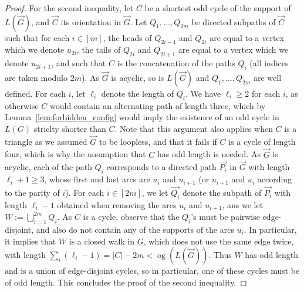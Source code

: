 \documentclass[11pt,a4aper]{article}
\renewcommand{\ge}{\geqslant}
\renewcommand{\geq}{\geqslant}
\DeclareRobustCommand*{\ora}{\overrightarrow}
\DeclareMathOperator{\og}{og}
\newcommand*{\orC}{\ora{C}}
\newcommand*{\orG}{\ora{G}}
\newcommand{\ugo}[1]{{\color{red} UG: #1}}
\begin{document}
\begin{proof}
  For the second inequality, let $C$ be a shortest odd cycle of the support of $L(\orG)$, and $\orC$ its orientation in $\orG$. Let
  $Q_1, \dots, Q_{2m}$ be directed subpaths of $\orC$ such that for each $i\in [m]$, the heads of
  $Q_{2i-1}$ and $Q_{2i}$ are equal to a vertex which we denote $u_{2i}$, the tails of $Q_{2i}$
  and $Q_{2i+1}$ are equal to a vertex which we denote $u_{2i+1}$, and such that $C$
  is the concatenation of the paths $Q_i$ (all indices are taken modulo $2m$). As $\orG$ is acyclic, so is $L(\orG)$
  and $Q_1, \dots, Q_{2m}$ are well defined.
  For each $i$, let $\ell_i$ denote the
  length of $Q_i$. We have $\ell_i \ge 2$ for each $i$, as otherwise $C$
  would contain an alternating path of length three, which by
  Lemma~\ref{lem:forbidden_config} would imply the existence of an odd cycle in
  $L(G)$ striclty shorter than $C$. Note that this argument also applies when $C$ is a triangle as we assumed $\orG$ to be loopless, and that it fails if $C$ is a cycle of length four, which
  is why the assumption that $C$ has odd length is needed. As $\orG$ is acyclic, each of the path $Q_i$ corresponds to a directed path $\ora{P_i}$ in
  $\orG$ with length $\ell_i +1\geq 3$, whose first and last arcs are $u_{i}$ and
  $u_{i+1}$ (or $u_{i+1}$ and $u_{i}$ according to the parity of $i$). For each $i\in [2m]$, we let $\ora{Q_i}$ denote the subpath of $\ora{P_i}$ with length $\ell_i-1$ obtained when removing the arcs $u_i$ and $u_{i+1}$, ans we let $W:=\bigcup_{i=1}^{2m}Q_i$. As $C$ is a cycle, observe that the $Q_i$'s must be pairwise edge-disjoint, and also do not contain any of the supports of the arcs $u_i$. In particular, it implies that $W$ is a closed walk in $G$, which does not use the same edge twice, with length $\sum_i (\ell_i -1) = |C| - 2m < \og(L(\orG))$. Thus $W$ has odd length and is a union of edge-disjoint cycles, so in particular, one of these cycles must be of odd length. This concludes the proof of the second inequality.
\end{proof}
\end{document}
